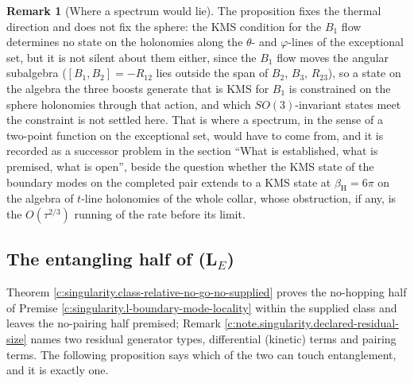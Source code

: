 \documentclass[11pt]{article}
\theoremstyle{definition}
\newtheorem{remark}[theorem]{Remark}
\theoremstyle{plain}
\begin{document}
\begin{remark}[Where a spectrum would lie]\label{c:note.singularity.where-spectrum-would-lie}
The proposition fixes the thermal direction and does not fix the sphere: the KMS condition for the $B_1$ flow determines no state on the holonomies along the $\theta$- and $\varphi$-lines of the exceptional set, but it is not silent about them either, since the $B_1$ flow moves the angular subalgebra ($[B_1, B_2] = -R_{12}$ lies outside the span of $B_2$, $B_3$, $R_{23}$), so a state on the algebra the three boosts generate that is KMS for $B_1$ is constrained on the sphere holonomies through that action, and which $SO(3)$-invariant states meet the constraint is not settled here. That is where a spectrum, in the sense of a two-point function on the exceptional set, would have to come from, and it is recorded as a successor problem in the section ``What is established, what is premised, what is open'', beside the question whether the KMS state of the boundary modes on the completed pair extends to a KMS state at $\beta_{\mathrm{H}} = 6\pi$ on the algebra of $t$-line holonomies of the whole collar, whose obstruction, if any, is the $O(\tau^{2/3})$ running of the rate before its limit.
\end{remark}

\subsection*{The entangling half of (L$_E$)}
\label{c:note.singularity.setting-entangling-half-l-e}
Theorem \ref{c:singularity.class-relative-no-go-no-supplied} proves the no-hopping half of Premise \ref{c:singularity.l-boundary-mode-locality} within the supplied class and leaves the no-pairing half premised; Remark \ref{c:note.singularity.declared-residual-size} names two residual generator types, differential (kinetic) terms and pairing terms. The following proposition says which of the two can touch entanglement, and it is exactly one.
\end{document}
